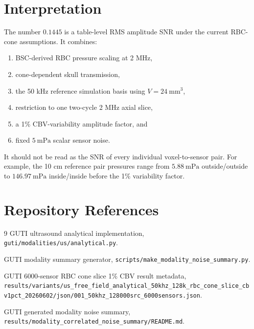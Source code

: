 \documentclass[11pt]{article}
\begin{document}
\section*{Interpretation}

The number \(0.1445\) is a table-level RMS amplitude SNR under the current
RBC-cone assumptions.  It combines:
\begin{enumerate}
  \item BSC-derived RBC pressure scaling at 2 MHz,
  \item cone-dependent skull transmission,
  \item the 50 kHz reference simulation basis using \(V=24~\mathrm{mm}^{3}\),
  \item restriction to one two-cycle 2 MHz axial slice,
  \item a 1\% CBV-variability amplitude factor, and
  \item fixed \(5~\mathrm{mPa}\) scalar sensor noise.
\end{enumerate}

It should not be read as the SNR of every individual voxel-to-sensor pair.
For example, the 10 cm reference pair pressures range from
\(5.88~\mathrm{mPa}\) outside/outside to \(146.97~\mathrm{mPa}\) inside/inside
before the 1\% variability factor.

\section*{Repository References}

\begin{thebibliography}{9}
GUTI ultrasound analytical implementation,
\texttt{guti/modalities/us/analytical.py}.

GUTI modality summary generator,
\texttt{scripts/make\_modality\_noise\_summary.py}.

GUTI 6000-sensor RBC cone slice 1\% CBV result metadata,
\texttt{results/variants/us\_free\_field\_analytical\_50khz\_128k\_rbc\_cone\_slice\_cbv1pct\_20260602/json/001\_50khz\_128000src\_6000sensors.json}.

GUTI generated modality noise summary,
\texttt{results/modality\_correlated\_noise\_summary/README.md}.
\end{thebibliography}
\end{document}
